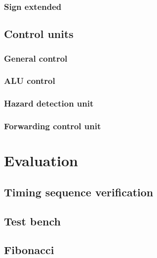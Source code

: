 \documentclass[11pt, a4paper, twoside]{article}
\begin{document}
\subsubsection{Sign extended}
\subsection{Control units}
\subsubsection{General control}
\subsubsection{ALU control}
\subsubsection{Hazard detection unit}
\subsubsection{Forwarding control unit}

\section{Evaluation}
\subsection{Timing sequence verification}
\subsection{Test bench}
\subsection{Fibonacci}
	
\end{document}
